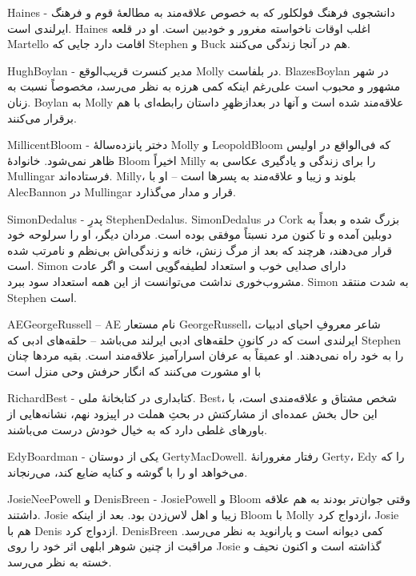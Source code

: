 \documentclass[12pt,onecolumn,a4paper]{book}
\begin{document}
    \gls{Haines} - دانشجوی فرهنگ فولکلور که به خصوص علاقه‌مند به مطالعۀ قوم و فرهنگ ایرلندی است. \gls{Haines} اغلب اوقات ناخواسته مغرور و خودبین است. او در قلعه \gls{Martello} اقامت دارد جایی که \gls{Stephen} و \gls{Buck} هم در آنجا زندگی می‌کنند.

    \gls{HughBoylan} - مدیر کنسرت قریب‌الوقع \gls{Molly} در بلفاست. \gls{BlazesBoylan} در شهر مشهور و محبوب است علی‌رغم اینکه کمی هرزه به نظر می‌رسد، مخصوصاً نسبت به زنان. \gls{Boylan} به \gls{Molly} علاقه‌مند شده است و آنها در بعدازظهرِ داستان رابطه‌ای با هم برقرار می‌کنند.

    \gls{MillicentBloom} - دختر پانزده‌سالۀ \gls{Molly} و \gls{LeopoldBloom} که فی‌الواقع در اولیس ظاهر نمی‌شود. خانوادۀ \gls{Bloom} اخیراً \gls{Milly} را برای زندگی و یادگیری عکاسی به \gls{Mullingar} فرستاده‌اند. \gls{Milly}، بلوند و زیبا و علاقه‌مند به پسرها است – او با \gls{AlecBannon} در \gls{Mullingar} قرار و مدار می‌گذارد.

    \gls{SimonDedalus} - پدرِ \gls{StephenDedalus}. \gls{SimonDedalus} در \gls{Cork} بزرگ شده و بعداً به دوبلین آمده و تا کنون مرد نسبتاً موفقی بوده است. مردان دیگر، او را سرلوحه خود قرار می‌دهند، هرچند که بعد از مرگ زنش، خانه و زندگی‌اش بی‌نظم و نامرتب شده است. \gls{Simon} دارای صدایی خوب و استعداد لطیفه‌گویی است و اگر عادت مشروب‌خوری نداشت می‌توانست از این همه استعداد سود ببرد. \gls{Simon} به شدت منتقد \gls{Stephen} است.

    \gls{AEGeorgeRussell} – \gls{AE} نام مستعار \gls{GeorgeRussell}، شاعر معروفِ احیای ادبیات ایرلندی است که در کانونِ حلقه‌های ادبی ایرلند می‌باشد – حلقه‌های ادبی که \gls{Stephen} را به خود راه نمی‌دهند. او عمیقاً به عرفان اسرارآمیز علاقه‌مند است. بقیه مردها چنان با او مشورت می‌کنند که انگار حرفش وحی منزل است

    \gls{RichardBest} - کتابداری در کتابخانۀ ملی. \gls{Best}، شخص مشتاق و علاقه‌مندی است، با این حال بخش عمده‌ای از مشارکتش در بحثِ هملت در اپیزود نهم، نشانه‌هایی از باورهای غلطی دارد که به خیال خودش درست می‌باشند.

    \gls{EdyBoardman} - یکی از دوستان \gls{GertyMacDowell}. رفتار مغرورانۀ \gls{Gerty}، \gls{Edy} را که می‌خواهد او را با گوشه و کنایه ضایع کند، می‌رنجاند.

    \gls{JosieNeePowell} و \gls{DenisBreen} - \gls{JosiePowell} و \gls{Bloom} وقتی جوان‌تر بودند به هم علاقه داشتند.
    \gls{Josie} زیبا و اهل لاس‌زدن بود.
    بعد از اینکه \gls{Bloom} با \gls{Molly} ازدواج کرد، \gls{Josie} هم با \gls{Denis} ازدواج کرد.
     \gls{DenisBreen} کمی دیوانه است و پارانوید به نظر می‌رسد.
    مراقبت از چنین شوهر ابلهی اثر خود را روی \gls{Josie} گذاشته است و اکنون نحیف و خسته به نظر می‌رسد.
\end{document}
